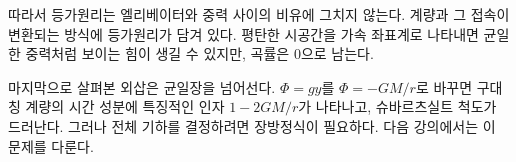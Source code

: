 따라서 등가원리는 엘리베이터와 중력 사이의 비유에 그치지 않는다. 계량과 그 접속이 변환되는 방식에 등가원리가 담겨 있다. 평탄한 시공간을 가속 좌표계로 나타내면 균일한 중력처럼 보이는 힘이 생길 수 있지만, 곡률은 0으로 남는다.

마지막으로 살펴본 외삽은 균일장을 넘어선다. \(\Phi=gy\)를 \(\Phi=-GM/r\)로 바꾸면 구대칭 계량의 시간 성분에 특징적인 인자 \(1-2GM/r\)가 나타나고, 슈바르츠실트 척도가 드러난다. 그러나 전체 기하를 결정하려면 장방정식이 필요하다. 다음 강의에서는 이 문제를 다룬다.
